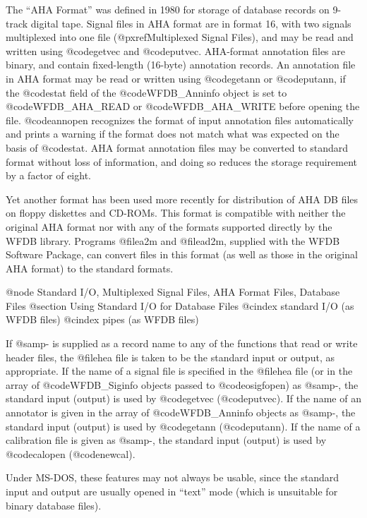 {{{{{{{{{{The ``AHA Format'' was defined in 1980 for storage of database records
on 9-track digital tape.  Signal files in AHA format are in format 16,
with two signals multiplexed into one file (@pxref{Multiplexed Signal Files}),
and may be read and written using @code{getvec} and @code{putvec}.
AHA-format annotation files are binary, and contain fixed-length
(16-byte) annotation records.  An annotation file in AHA format may be
read or written using @code{getann} or @code{putann}, if the @code{stat}
field of the @code{WFDB_Anninfo} object is set to @code{WFDB_AHA_READ} or
@code{WFDB_AHA_WRITE} before opening the file.  @code{annopen} recognizes the
format of input annotation files automatically and prints a warning if
the format does not match what was expected on the basis of @code{stat}.
AHA format annotation files may be converted to standard format without
loss of information, and doing so reduces the storage requirement by a
factor of eight.

Yet another format has been used more recently for distribution of AHA DB files
on floppy diskettes and CD-ROMs.  This format is compatible with neither the
original AHA format nor with any of the formats supported directly by the WFDB
library.  Programs @file{a2m} and @file{ad2m}, supplied with the WFDB Software
Package, can convert files in this format (as well as those in the original AHA
format) to the standard formats.

@node Standard I/O, Multiplexed Signal Files, AHA Format Files, Database Files
@section Using Standard I/O for Database Files
@cindex standard I/O (as WFDB files)
@cindex pipes (as WFDB files)

If @samp{-} is supplied as a record name to any of the functions that
read or write header files, the @file{hea} file is taken to be
the standard input or output, as appropriate.  If the name of a signal
file is specified in the @file{hea} file (or in the array of
@code{WFDB_Siginfo} objects passed to @code{osigfopen}) as @samp{-}, the
standard input (output) is used by @code{getvec} (@code{putvec}).  If
the name of an annotator is given in the array of @code{WFDB_Anninfo} objects
as @samp{-}, the standard input (output) is used by @code{getann}
(@code{putann}).  If the name of a calibration file is given as
@samp{-}, the standard input (output) is used by @code{calopen}
(@code{newcal}).

Under MS-DOS, these features may not always be usable, since the
standard input and output are usually opened in ``text'' mode (which
is unsuitable for binary database files).

}}}}}}}}}}
